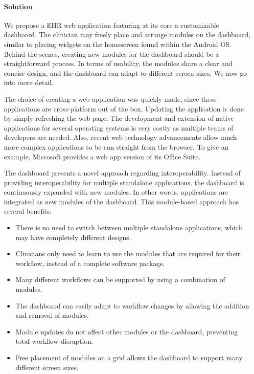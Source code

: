     \paragraph{Solution} We propose a EHR web application featuring at its core a customizable dashboard. The clinician may freely place and arrange modules on the dashboard, similar to placing widgets on the homescreen found within the Android OS\@. Behind-the-scenes, creating new modules for the dashboard should be a straightforward process. In terms of usability, the modules share a clear and concise design, and the dashboard can adapt to different screen sizes. We now go into more detail.

    The choice of creating a web application was quickly made, since these applications are cross-platform out of the box. Updating the application is done by simply refreshing the web page. The development and extension of native applications for several operating systems is very costly as multiple teams of developers are needed. Also, recent web technology advancements allow much more complex applications to be run straight from the browser. To give an example, Microsoft provides a web app version of its Office Suite. 

    The dashboard presents a novel approach regarding interoperability. Instead of providing interoperability for multiple standalone applications, the dashboard is continuously expanded with new modules. In other words, applications are integrated as new modules of the dashboard. This module-based approach has several benefits:
    \begin{itemize}
        \item There is no need to switch between multiple standalone applications, which may have completely different designs.
        \item Clinicians only need to learn to use the modules that are required for their workflow, instead of a complete software package.
        \item Many different workflows can be supported by using a combination of modules.
        \item The dashboard can easily adapt to workflow changes by allowing the addition and removal of modules.
        \item Module updates do not affect other modules or the dashboard, preventing total workflow disruption.
        \item Free placement of modules on a grid allows the dashboard to support many different screen sizes.
    \end{itemize}

